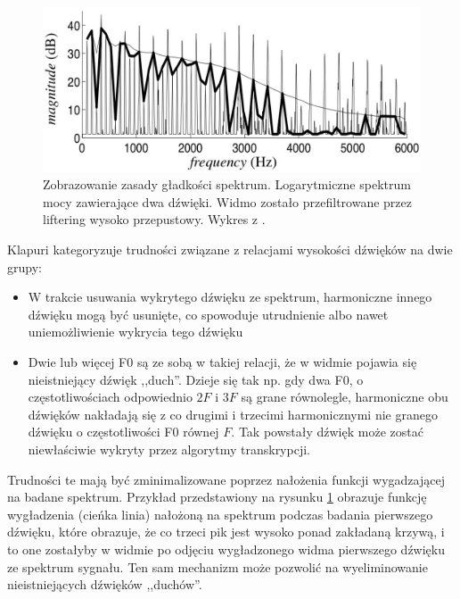 \documentclass[12pt,a4paper,twoside]{mwart}
\begin{document}
\begin{figure}[ht]
  \begin{center}
    \includegraphics[scale=0.38]{images/spectral_smoothnes_kapuri.jpg}
    \caption{Zobrazowanie zasady gładkości spektrum. Logarytmiczne spektrum mocy zawierające dwa dźwięki. Widmo zostało przefiltrowane przez liftering wysoko przepustowy. Wykres z \cite[3383]{Transcription:Klapuri:MultipitchEstimationAndSeparation}.}
    \label{fig:specSmooth:kapuri}
  \end{center}
\end{figure}

Klapuri kategoryzuje trudności związane z relacjami wysokości dźwięków na dwie grupy:
\begin{itemize}
\item{} W trakcie usuwania wykrytego dźwięku ze spektrum, harmoniczne innego dźwięku mogą być usunięte, co spowoduje utrudnienie albo nawet uniemożliwienie wykrycia tego dźwięku
\item{} Dwie lub więcej F0 są ze sobą w takiej relacji, że w widmie pojawia się nieistniejący dźwięk ,,duch''. Dzieje się tak np. gdy dwa F0, o częstotliwościach odpowiednio $2F$ i $3F$ są grane równolegle, harmoniczne obu dźwięków nakładają się z co drugimi i trzecimi harmonicznymi nie granego dźwięku o częstotliwości F0 równej $F$. Tak powstały dźwięk może zostać niewłaściwie wykryty przez algorytmy transkrypcji.
\end{itemize}
Trudności te mają być zminimalizowane poprzez nałożenia funkcji wygadzającej na badane spektrum. Przykład przedstawiony na rysunku \ref{fig:specSmooth:kapuri} obrazuje funkcję wygładzenia (cieńka linia) nałożoną na spektrum podczas badania pierwszego dźwięku, które obrazuje, że co trzeci pik jest wysoko ponad zakładaną krzywą, i to one zostałyby w widmie po odjęciu wygładzonego widma pierwszego dźwięku ze spektrum sygnału. Ten sam mechanizm może pozwolić na wyeliminowanie nieistniejących dźwięków ,,duchów''.
\end{document}
